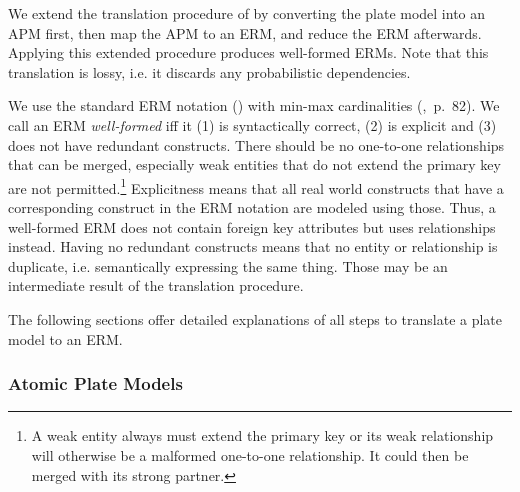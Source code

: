 
We extend the translation procedure of \textcite{heckerman2007probabilistic} by converting the plate model into an APM first, then map the APM to an ERM, and reduce the ERM afterwards. Applying this extended procedure produces well-formed ERMs. Note that this translation is lossy, i.e. it discards any probabilistic dependencies.

We use the standard ERM notation (\cite{chen1976entity}) with min-max cardinalities (\cite{elmasri2007database},~p.~82). We call an ERM \emph{well-formed} iff it (1) is syntactically correct, (2) is explicit and (3) does not have redundant constructs. There should be no one-to-one relationships that can be merged, especially weak entities that do not extend the primary key are not permitted.\footnote{A weak entity always must extend the primary key or its weak relationship will otherwise be a malformed one-to-one relationship. It could then be merged with its strong partner.} Explicitness means that all real world constructs that have a corresponding construct in the ERM notation are modeled using those. Thus, a well-formed ERM does not contain foreign key attributes but uses relationships instead. Having no redundant constructs means that no entity or relationship is duplicate, i.e. semantically expressing the same thing. Those may be an intermediate result of the translation procedure.

The following sections offer detailed explanations of all steps to translate a plate model to an ERM.

\subsubsection{Atomic Plate Models}

